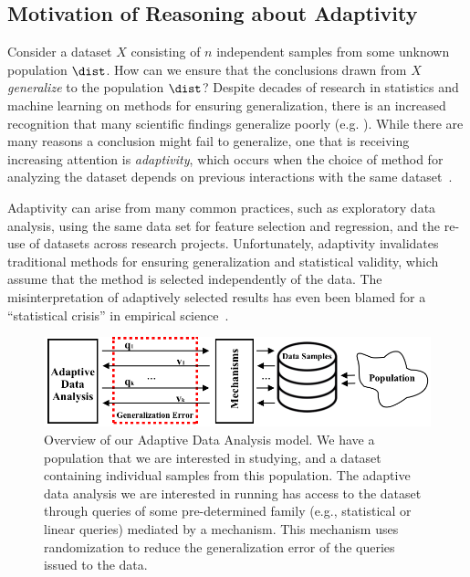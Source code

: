 \subsection{Motivation of Reasoning about Adaptivity}
% 
Consider a dataset $X$ consisting of $n$ independent samples from some unknown population $\dist$.  How can we ensure that the conclusions drawn from $X$ \emph{generalize} to the population $\dist$?  Despite decades of research in statistics and machine learning on methods for ensuring generalization, there is an increased recognition that many scientific findings generalize poorly (e.g. 
\cite{Ioannidis05,GelmanL13}
).  While there are many reasons a conclusion might fail to generalize, one that is receiving increasing attention is \emph{adaptivity}, which occurs when the choice of method for analyzing the dataset depends on previous interactions with the same dataset~\cite{GelmanL13}.

 Adaptivity can arise from many common practices, such as exploratory data analysis, using the same data set for feature selection and regression, and the re-use of datasets across research projects.  Unfortunately, adaptivity invalidates traditional methods for ensuring generalization and statistical validity, which assume that the method is selected independently of the data. The misinterpretation of adaptively selected results has even been blamed for a ``statistical crisis'' in empirical science~\cite{GelmanL13}.

\begin{figure}
    \centering
    \includegraphics[width=0.7\columnwidth]{figures/data_analysis_model.png}
    \caption{Overview of our Adaptive Data Analysis model. We have a population that we are interested in studying, and a dataset containing individual samples from this population. The adaptive data analysis we are interested in running has access to the dataset through queries of some pre-determined family (e.g., statistical or linear queries) mediated by a mechanism. This mechanism uses randomization to reduce the generalization error of the queries issued to the data.}
    \label{fig:adaptivity-model-overview}
\vspace{-0.5cm}
\end{figure}

